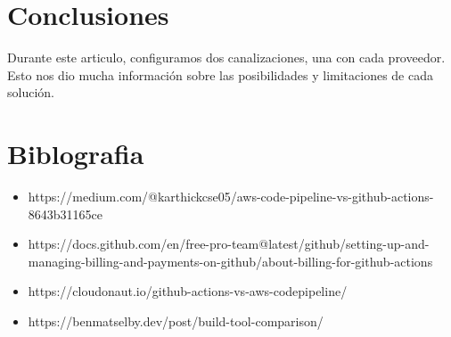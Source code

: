 \documentclass[twoside,twocolumn]{article}
\begin{document}
\section{Conclusiones}
Durante este articulo, configuramos dos canalizaciones, una con cada proveedor. Esto nos dio mucha información sobre las posibilidades y limitaciones de cada solución.

\section{Biblografia}

\begin{itemize}
    \item https://medium.com/@karthickcse05/aws-code-pipeline-vs-github-actions-8643b31165ce
    \item https://docs.github.com/en/free-pro-team@latest/github/setting-up-and-managing-billing-and-payments-on-github/about-billing-for-github-actions
    \item https://cloudonaut.io/github-actions-vs-aws-codepipeline/
    \item https://benmatselby.dev/post/build-tool-comparison/
\end{itemize}

\end{document}
